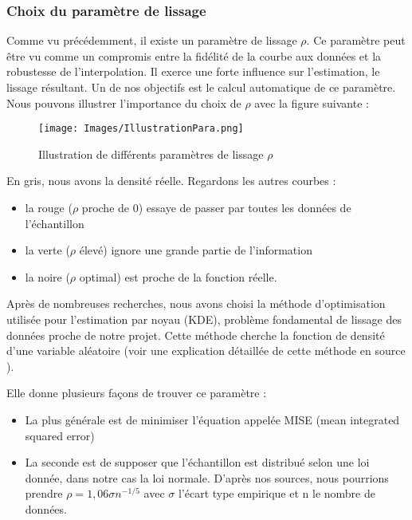 \documentclass[a4paper,12pt]{article} %
\begin{document}
			\subsubsection{Choix du paramètre de lissage}
                Comme vu précédemment, il existe un paramètre de lissage $\rho$. Ce paramètre peut être vu comme un compromis entre la fidélité de la courbe aux données et la robustesse de l'interpolation. Il exerce une forte influence sur l'estimation, le lissage résultant. Un de nos objectifs est le calcul automatique de ce paramètre. Nous pouvons illustrer l'importance du choix de $\rho$ avec la figure suivante :
                
                \begin{figure}[H]
                \begin{center}
                \texttt{[image: Images/IllustrationPara.png]} 
                \end{center}
                \caption{Illustration de différents paramètres de lissage $\rho$}
                \label{CasNonfonctionnel}
                \end{figure}
                
                En gris, nous avons la densité réelle. Regardons les autres courbes :
                \begin{itemize}
                    \item la rouge ($\rho$ proche de 0) essaye de passer par toutes les données de l'échantillon
                    \item la verte ($\rho$ élevé) ignore une grande partie de l'information
                    \item la noire ($\rho$ optimal) est proche de la fonction réelle.
                \end{itemize}
                
                 Après de nombreuses recherches, nous avons choisi la méthode d'optimisation utilisée pour l'estimation par noyau (KDE), problème fondamental de lissage des données proche de notre projet. 
                Cette méthode cherche la fonction de densité d'une variable aléatoire (voir une explication détaillée de cette méthode en source \cite{Estimation_par_noyau}).
                
                Elle donne plusieurs façons de trouver ce paramètre :
                \begin{itemize}
                        \item  La plus générale est de minimiser l'équation appelée MISE (mean integrated squared error) \cite{MISE}
                        \item 	La seconde est de supposer que l'échantillon est distribué selon une loi donnée, dans notre cas la loi normale. D'après nos sources, nous pourrions prendre $\rho=1,06\sigma n^{-1/5}$ avec $\sigma$ l'écart type empirique et n le nombre de données.
                \end{itemize}
                
\end{document}
